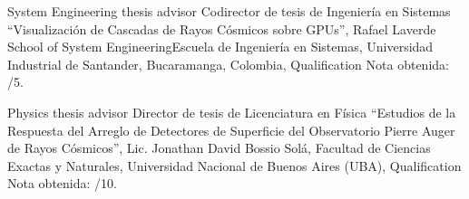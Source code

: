 \ifeng
System Engineering thesis advisor
 \else
Codirector de tesis de Ingeniería en Sistemas
 \fi
``Visualización de Cascadas de Rayos Cósmicos sobre GPUs'', Rafael Laverde \at \ifeng School of System Engineering\else Escuela de Ingeniería en Sistemas\fi, Universidad Industrial de Santander, Bucaramanga, Colombia, \ifeng Qualification \else Nota obtenida: /5.

\ifeng
Physics thesis advisor
 \else
Director de tesis de Licenciatura en Física
 \fi
``Estudios de la Respuesta del Arreglo de Detectores de Superficie del Observatorio Pierre Auger de Rayos Cósmicos'', Lic. Jonathan David Bossio Solá, \at Facultad de Ciencias Exactas y Naturales, Universidad Nacional de Buenos Aires (UBA), \ifeng Qualification \else Nota obtenida: /10.